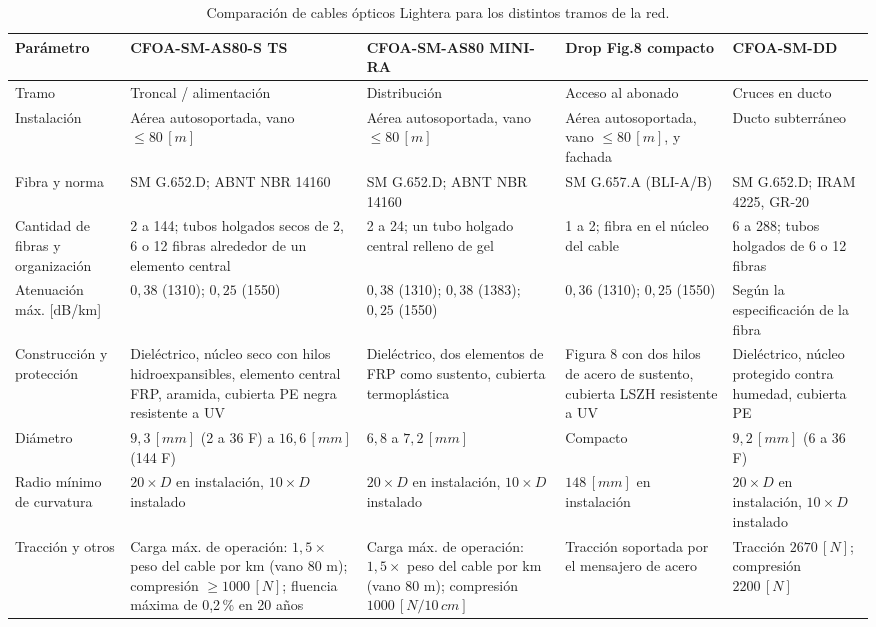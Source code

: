 \begin{table}[H]
    \centering
    \scriptsize
    \caption{Comparación de cables ópticos Lightera para los distintos tramos de la red.}
    \label{tab:cables}
    \begin{tabular}{|p{2.3cm}|p{2.9cm}|p{2.9cm}|p{2.9cm}|p{2.9cm}|}
        \hline
        \textbf{Parámetro} & \textbf{CFOA-SM-AS80-S TS} \cite{et_as_ts} & \textbf{CFOA-SM-AS80 MINI-RA} \cite{et_minira} & \textbf{Drop Fig.8 compacto} \cite{et_drop} & \textbf{CFOA-SM-DD} \cite{et_dd} \\
        \hline
        Tramo & Troncal / alimentación & Distribución & Acceso al abonado & Cruces en ducto \\
        \hline
        Instalación & Aérea autosoportada, vano $\leq 80 \, [m]$ & Aérea autosoportada, vano $\leq 80 \, [m]$ & Aérea autosoportada, vano $\leq 80 \, [m]$, y fachada & Ducto subterráneo \\
        \hline
        Fibra y norma & SM G.652.D; ABNT NBR 14160 & SM G.652.D; ABNT NBR 14160 & SM G.657.A (BLI-A/B) & SM G.652.D; IRAM 4225, GR-20 \\
        \hline
        Cantidad de fibras y organización & 2 a 144; tubos holgados secos de 2, 6 o 12 fibras alrededor de un elemento central & 2 a 24; un tubo holgado central relleno de gel & 1 a 2; fibra en el núcleo del cable & 6 a 288; tubos holgados de 6 o 12 fibras \\
        \hline
        Atenuación máx. [dB/km] & $0{,}38$ (1310); $0{,}25$ (1550) & $0{,}38$ (1310); $0{,}38$ (1383); $0{,}25$ (1550) & $0{,}36$ (1310); $0{,}25$ (1550) & Según la especificación de la fibra \\
        \hline
        Construcción y protección & Dieléctrico, núcleo seco con hilos hidroexpansibles, elemento central FRP, aramida, cubierta PE negra resistente a UV & Dieléctrico, dos elementos de FRP como sustento, cubierta termoplástica & Figura 8 con dos hilos de acero de sustento, cubierta LSZH resistente a UV & Dieléctrico, núcleo protegido contra humedad, cubierta PE \\
        \hline
        Diámetro & $9{,}3 \, [mm]$ (2 a 36 F) a $16{,}6 \, [mm]$ (144 F) & $6{,}8$ a $7{,}2 \, [mm]$ & Compacto & $9{,}2 \, [mm]$ (6 a 36 F) \\
        \hline
        Radio mínimo de curvatura & $20 \times D$ en instalación, $10 \times D$ instalado & $20 \times D$ en instalación, $10 \times D$ instalado & $148 \, [mm]$ en instalación & $20 \times D$ en instalación, $10 \times D$ instalado \\
        \hline
        Tracción y otros & Carga máx. de operación: $1{,}5 \times$ peso del cable por km (vano 80 m); compresión $\geq 1000 \, [N]$; fluencia máxima de 0,2\,\% en 20 años & Carga máx. de operación: $1{,}5 \times$ peso del cable por km (vano 80 m); compresión $1000 \, [N/10 \, cm]$ & Tracción soportada por el mensajero de acero & Tracción $2670 \, [N]$; compresión $2200 \, [N]$ \\
        \hline
    \end{tabular}
\end{table}

